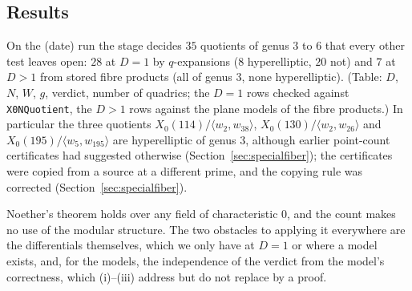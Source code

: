 \subsection{Results}

On the (date) run the stage decides $35$ quotients of genus $3$ to $6$ that every other test leaves
open: $28$ at $D = 1$ by $q$-expansions ($8$ hyperelliptic, $20$ not) and $7$ at $D > 1$ from stored
fibre products (all of genus $3$, none hyperelliptic). (Table: $D$, $N$, $W$, $g$, verdict, number of
quadrics; the $D = 1$ rows checked against \texttt{X0NQuotient}, the $D > 1$ rows against the plane
models of the fibre products.) In particular the three quotients $X_0(114)/\langle w_2,w_{38}\rangle$,
$X_0(130)/\langle w_2,w_{26}\rangle$ and $X_0(195)/\langle w_5,w_{195}\rangle$ are hyperelliptic of
genus $3$, although earlier point-count certificates had suggested otherwise
(Section~\ref{sec:specialfiber}); the certificates were copied from a source at a different prime,
and the copying rule was corrected (Section~\ref{sec:specialfiber}).

\begin{remark}
Noether's theorem holds over any field of characteristic $0$, and the count makes no use of the
modular structure. The two obstacles to applying it everywhere are the differentials themselves,
which we only have at $D = 1$ or where a model exists, and, for the models, the independence of the
verdict from the model's correctness, which (i)--(iii) address but do not replace by a proof.
\end{remark}
